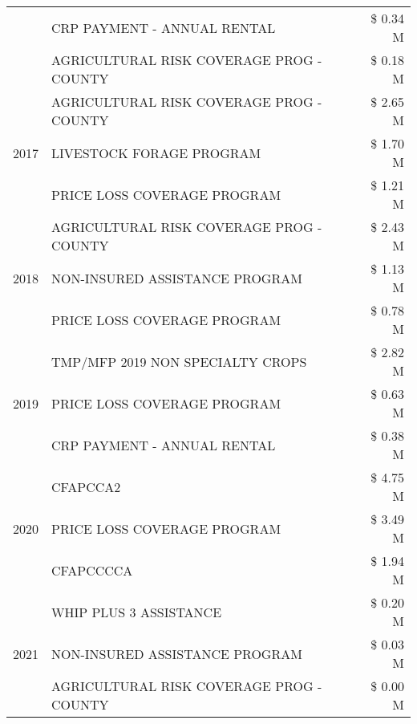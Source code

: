 \begin{tabular}{llr}
 & CRP PAYMENT - ANNUAL RENTAL & \$ 0.34 M \\
 & AGRICULTURAL RISK COVERAGE PROG - COUNTY & \$ 0.18 M \\
\cline{1-3}
\multirow[t]{3}{*}{2017} & AGRICULTURAL RISK COVERAGE PROG - COUNTY & \$ 2.65 M \\
 & LIVESTOCK FORAGE PROGRAM & \$ 1.70 M \\
 & PRICE LOSS COVERAGE PROGRAM & \$ 1.21 M \\
\cline{1-3}
\multirow[t]{3}{*}{2018} & AGRICULTURAL RISK COVERAGE PROG - COUNTY & \$ 2.43 M \\
 & NON-INSURED ASSISTANCE PROGRAM & \$ 1.13 M \\
 & PRICE LOSS COVERAGE PROGRAM & \$ 0.78 M \\
\cline{1-3}
\multirow[t]{3}{*}{2019} & TMP/MFP 2019 NON SPECIALTY CROPS & \$ 2.82 M \\
 & PRICE LOSS COVERAGE PROGRAM & \$ 0.63 M \\
 & CRP PAYMENT - ANNUAL RENTAL & \$ 0.38 M \\
\cline{1-3}
\multirow[t]{3}{*}{2020} & CFAPCCA2 & \$ 4.75 M \\
 & PRICE LOSS COVERAGE PROGRAM & \$ 3.49 M \\
 & CFAPCCCCA & \$ 1.94 M \\
\cline{1-3}
\multirow[t]{3}{*}{2021} & WHIP PLUS 3 ASSISTANCE & \$ 0.20 M \\
 & NON-INSURED ASSISTANCE PROGRAM & \$ 0.03 M \\
 & AGRICULTURAL RISK COVERAGE PROG - COUNTY & \$ 0.00 M \\
\cline{1-3}
\bottomrule
\end{tabular}

